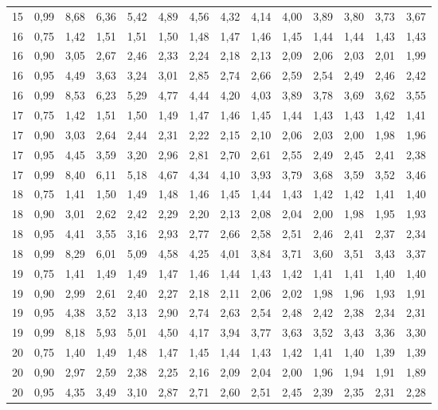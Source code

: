 \documentclass[
]{article}
\begin{document}
\begin{landscape}
\begin{longtable}[t]{cccccccccccccc}
15 & 0,99 & 8,68 & 6,36 & 5,42 & 4,89 & 4,56 & 4,32 & 4,14 & 4,00 & 3,89 & 3,80 & 3,73 & 3,67\\
16 & 0,75 & 1,42 & 1,51 & 1,51 & 1,50 & 1,48 & 1,47 & 1,46 & 1,45 & 1,44 & 1,44 & 1,43 & 1,43\\
16 & 0,90 & 3,05 & 2,67 & 2,46 & 2,33 & 2,24 & 2,18 & 2,13 & 2,09 & 2,06 & 2,03 & 2,01 & 1,99\\
16 & 0,95 & 4,49 & 3,63 & 3,24 & 3,01 & 2,85 & 2,74 & 2,66 & 2,59 & 2,54 & 2,49 & 2,46 & 2,42\\
16 & 0,99 & 8,53 & 6,23 & 5,29 & 4,77 & 4,44 & 4,20 & 4,03 & 3,89 & 3,78 & 3,69 & 3,62 & 3,55\\
17 & 0,75 & 1,42 & 1,51 & 1,50 & 1,49 & 1,47 & 1,46 & 1,45 & 1,44 & 1,43 & 1,43 & 1,42 & 1,41\\
17 & 0,90 & 3,03 & 2,64 & 2,44 & 2,31 & 2,22 & 2,15 & 2,10 & 2,06 & 2,03 & 2,00 & 1,98 & 1,96\\
17 & 0,95 & 4,45 & 3,59 & 3,20 & 2,96 & 2,81 & 2,70 & 2,61 & 2,55 & 2,49 & 2,45 & 2,41 & 2,38\\
17 & 0,99 & 8,40 & 6,11 & 5,18 & 4,67 & 4,34 & 4,10 & 3,93 & 3,79 & 3,68 & 3,59 & 3,52 & 3,46\\
18 & 0,75 & 1,41 & 1,50 & 1,49 & 1,48 & 1,46 & 1,45 & 1,44 & 1,43 & 1,42 & 1,42 & 1,41 & 1,40\\
18 & 0,90 & 3,01 & 2,62 & 2,42 & 2,29 & 2,20 & 2,13 & 2,08 & 2,04 & 2,00 & 1,98 & 1,95 & 1,93\\
18 & 0,95 & 4,41 & 3,55 & 3,16 & 2,93 & 2,77 & 2,66 & 2,58 & 2,51 & 2,46 & 2,41 & 2,37 & 2,34\\
18 & 0,99 & 8,29 & 6,01 & 5,09 & 4,58 & 4,25 & 4,01 & 3,84 & 3,71 & 3,60 & 3,51 & 3,43 & 3,37\\
19 & 0,75 & 1,41 & 1,49 & 1,49 & 1,47 & 1,46 & 1,44 & 1,43 & 1,42 & 1,41 & 1,41 & 1,40 & 1,40\\
19 & 0,90 & 2,99 & 2,61 & 2,40 & 2,27 & 2,18 & 2,11 & 2,06 & 2,02 & 1,98 & 1,96 & 1,93 & 1,91\\
19 & 0,95 & 4,38 & 3,52 & 3,13 & 2,90 & 2,74 & 2,63 & 2,54 & 2,48 & 2,42 & 2,38 & 2,34 & 2,31\\
19 & 0,99 & 8,18 & 5,93 & 5,01 & 4,50 & 4,17 & 3,94 & 3,77 & 3,63 & 3,52 & 3,43 & 3,36 & 3,30\\
20 & 0,75 & 1,40 & 1,49 & 1,48 & 1,47 & 1,45 & 1,44 & 1,43 & 1,42 & 1,41 & 1,40 & 1,39 & 1,39\\
20 & 0,90 & 2,97 & 2,59 & 2,38 & 2,25 & 2,16 & 2,09 & 2,04 & 2,00 & 1,96 & 1,94 & 1,91 & 1,89\\
20 & 0,95 & 4,35 & 3,49 & 3,10 & 2,87 & 2,71 & 2,60 & 2,51 & 2,45 & 2,39 & 2,35 & 2,31 & 2,28\\

\end{longtable}
\end{landscape}
\end{document}

